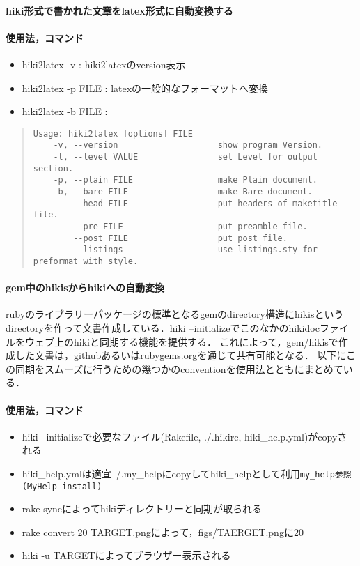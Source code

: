 \paragraph{hiki形式で書かれた文章をlatex形式に自動変換する}
\paragraph{使用法，コマンド}
\begin{itemize}
\item hiki2latex -v : hiki2latexのversion表示
\item hiki2latex -p FILE : latexの一般的なフォーマットへ変換
\item hiki2latex -b FILE :
\end{itemize}\begin{quote}\begin{verbatim}
Usage: hiki2latex [options] FILE
    -v, --version                    show program Version.
    -l, --level VALUE                set Level for output section.
    -p, --plain FILE                 make Plain document.
    -b, --bare FILE                  make Bare document.
        --head FILE                  put headers of maketitle file.
        --pre FILE                   put preamble file.
        --post FILE                  put post file.
        --listings                   use listings.sty for preformat with style.
\end{verbatim}\end{quote}
\paragraph{gem中のhikisからhikiへの自動変換}
rubyのライブラリーパッケージの標準となるgemのdirectory構造にhikisというdirectoryを作って文書作成している．hiki --initializeでこのなかのhikidocファイルをウェブ上のhikiと同期する機能を提供する．
これによって，gem/hikisで作成した文書は，githubあるいはrubygems.orgを通じて共有可能となる．
以下にこの同期をスムーズに行うための幾つかのconventionを使用法とともにまとめている．

\paragraph{使用法，コマンド}
\begin{itemize}
\item hiki --initializeで必要なファイル(Rakefile, ./.hikirc, hiki\_help.yml)がcopyされる
\item hiki\_help.ymlは適宜~/.my\_helpにcopyしてhiki\_helpとして利用\verb|my_help参照(MyHelp_install)|
\item rake syncによってhikiディレクトリーと同期が取られる
\item rake convert 20 TARGET.pngによって，figs/TAERGET.pngに20%
\item hiki -u TARGETによってブラウザー表示される
\end{itemize}
